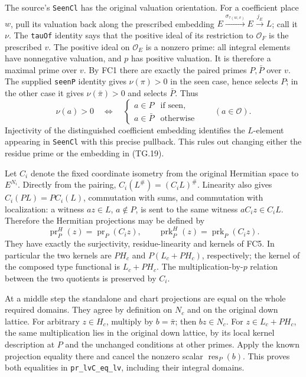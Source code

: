 \documentclass[11pt,a4paper]{article}
\numberwithin{equation}{section}
\theoremstyle{remark}\newtheorem{remark}[theorem]{Remark}
\begin{document}
The source's \texttt{SeenCl} has the original valuation
orientation. For a coefficient place $w$, pull its valuation back
along the prescribed embedding
$E\xrightarrow{\sigma_{\tau(w,v)}}E\xrightarrow{j_E}L$;
call it $\nu$. The \texttt{tauOf} identity says that the positive
ideal of its restriction to $\mathcal O_F$ is the prescribed
$v$. The positive ideal on $\mathcal O_E$ is a nonzero prime:
all integral elements have nonnegative valuation, and $p$ has
positive valuation. It is therefore a maximal prime over $v$.
By FC1 there are exactly the paired primes $P,\bar P$ over $v$.
The supplied \texttt{seenP} identity gives $\nu(\pi)>0$ in
the seen case, hence selects $P$; in the other case it gives
$\nu(\bar\pi)>0$ and selects $\bar P$. Thus
\[
 \nu(a)>0\quad\Longleftrightarrow\quad
 \begin{cases}a\in P&\text{if seen},\\a\in\bar P&\text{otherwise}
 \end{cases}\qquad(a\in\mathcal O).
 \tag{TG.19}
\]
Injectivity of the distinguished coefficient embedding identifies
the $L$-element appearing in \texttt{SeenCl} with this precise
pullback. This rules out changing either the residue prime or
the embedding in (TG.19).

Let $C_i$ denote the fixed coordinate isometry from the original
Hermitian space to $E^{N_i}$. Directly from the pairing,
$C_i(L^{\#})=(C_iL)^{\#}$. Linearity also gives
$C_i(P L)=P C_i(L)$, commutation with sums, and commutation with
localization: a witness $az\in L$, $a\notin P$, is sent to the
same witness $aC_i z\in C_iL$. Therefore the Hermitian
projections may be defined by
\[
 \operatorname{pr}^{H}_P(z)=\operatorname{pr}_P(C_i z),
 \qquad
 \operatorname{prk}^{H}_P(z)=\operatorname{prk}_P(C_i z).
 \tag{TG.20}
\]
They have exactly the surjectivity, residue-linearity and kernels
of FC5. In particular the two kernels are $PH_c$ and
$P(L_c+PH_c)$, respectively; the kernel of the composed type
functional is $L_c+PH_c$. The multiplication-by-$p$ relation
between the two quotients is preserved by $C_i$.

At a middle step the standalone and chart projections are equal
on the whole required domains. They agree by definition on
$N_c$ and on the original down lattice. For arbitrary
$z\in H_c$, multiply by $b=\bar\pi$; then $bz\in N_c$.
For $z\in L_c+PH_c$, the same multiplication lies in the
original down lattice, by its local kernel description at $P$
and the unchanged conditions at other primes. Apply the known
projection equality there and cancel the nonzero scalar
$\operatorname{res}_P(b)$. This proves both equalities in
\texttt{pr\_\allowbreak lvC\_\allowbreak eq\_\allowbreak lv}, including their integral domains.
\end{document}
